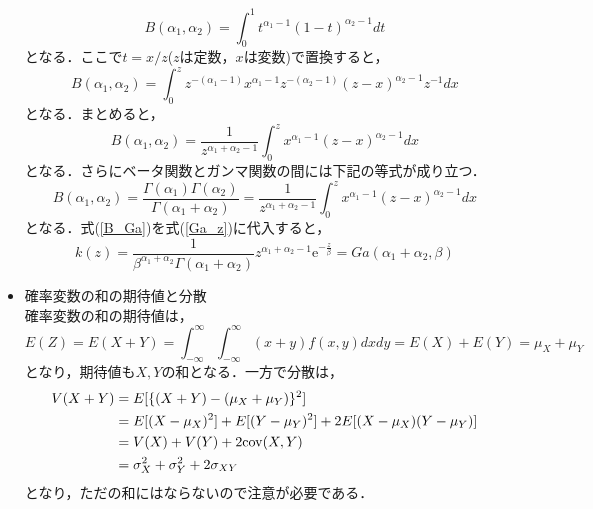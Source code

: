 \documentclass[autodetect-engine,dvipdfmx-if-dvi,ja=standard,a4paper,11pt]{bxjsarticle} %
\begin{document}
\begin{itemize}
\begin{equation}
B(\alpha_1,\alpha_2)=\displaystyle\int_{0}^{1}t^{\alpha_1-1}(1-t)^{\alpha_2-1}dt
\end{equation} 
となる．ここで$t=x/z$($z$は定数，$x$は変数)で置換すると，
\begin{equation}
B(\alpha_1,\alpha_2)=\displaystyle\int_{0}^{z}z^{-(\alpha_1-1)}x^{\alpha_1-1}z^{-(\alpha_2-1)}(z-x)^{\alpha_2-1}z^{-1}dx
\end{equation}
となる．まとめると，
\begin{equation}
B(\alpha_1,\alpha_2)=\frac{1}{z^{\alpha_1+\alpha_2-1}}\displaystyle\int_{0}^{z}x^{\alpha_1-1}(z-x)^{\alpha_2-1}dx
\end{equation}
となる．さらにベータ関数とガンマ関数の間には下記の等式が成り立つ．
\begin{equation}
\label{B_Ga}
B(\alpha_1,\alpha_2)=\frac{\Gamma(\alpha_1)\Gamma(\alpha_2)}{\Gamma(\alpha_1+\alpha_2)}=\frac{1}{z^{\alpha_1+\alpha_2-1}}\displaystyle\int_{0}^{z}x^{\alpha_1-1}(z-x)^{\alpha_2-1}dx
\end{equation}
となる．式(\ref{B_Ga})を式(\ref{Ga_z})に代入すると，
\begin{equation}
k(z)=\frac{1}{\beta^{\alpha_1+\alpha_2}\Gamma(\alpha_1+\alpha_2)}z^{\alpha_1+\alpha_2-1}\mathrm{e}^{-\frac{z}{\beta}}=Ga(\alpha_1+\alpha_2,\beta)
\end{equation}


\item 確率変数の和の期待値と分散\\
確率変数の和の期待値は，
\begin{equation}
E(Z)=E(X+Y)=\displaystyle\int_{-\infty}^{\infty}\int_{-\infty}^{\infty}(x+y)f(x,y)dxdy=E(X)+E(Y)=\mu_X+\mu_Y
\end{equation}
となり，期待値も$X,Y$の和となる．一方で分散は，
\begin{equation}
\begin{split}
V(X+Y)&=E[\{(X+Y)-(\mu_X+\mu_Y)\}^2]\\
&=E[(X-\mu_X)^2]+E[(Y-\mu_Y)^2]+2E[(X-\mu_X)(Y-\mu_Y)]\\
&=V(X)+V(Y)+2{\rm cov}(X,Y)\\
&=\sigma_X^2+\sigma_Y^2+2\sigma_{XY}\\
\end{split}
\end{equation}
となり，ただの和にはならないので注意が必要である．
\end{itemize}


\end{document}
